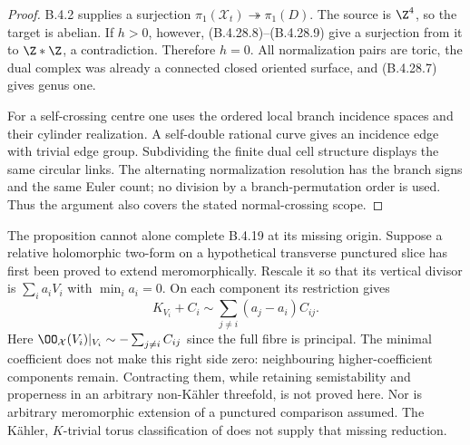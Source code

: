 \begin{proof}
B.4.2 supplies a surjection
$\pi_1(\mathcal X_t)\twoheadrightarrow\pi_1(D)$.
The source is $\Z^4$, so the target is abelian.
If $h>0$, however, (B.4.28.8)--(B.4.28.9) give a
surjection from it to $\Z*\Z$, a contradiction.
Therefore $h=0$. All normalization pairs are toric,
the dual complex was already a connected closed
oriented surface, and (B.4.28.7) gives genus one.

For a self-crossing centre one uses the ordered local
branch incidence spaces and their cylinder realization.
A self-double rational curve gives an incidence edge
with trivial edge group. Subdividing the finite dual
cell structure displays the same circular links.
The alternating normalization resolution has the
branch signs and the same Euler count; no division by
a branch-permutation order is used. Thus the argument
also covers the stated normal-crossing scope.
\end{proof}

\begin{remark}
The proposition cannot alone complete B.4.19 at its
missing origin. Suppose a relative holomorphic two-form
on a hypothetical transverse punctured slice has first
been proved to extend meromorphically. Rescale it so
that its vertical divisor is $\sum_i a_iV_i$ with
$\min_i a_i=0$. On each component its restriction gives
\[
 K_{V_i}+C_i\sim\sum_{j\ne i}(a_j-a_i)C_{ij}.          \tag{B.4.28.10}
\]
Here $\OO_{\mathcal X}(V_i)|_{V_i}\sim
-\sum_{j\ne i}C_{ij}$ since the full fibre is principal.
The minimal coefficient does not make this right side
zero: neighbouring higher-coefficient components remain.
Contracting them, while retaining semistability and
properness in an arbitrary non-K\"ahler threefold, is
not proved here. Nor is arbitrary meromorphic extension
of a punctured comparison assumed. The K\"ahler,
$K$-trivial torus classification of
\citet[Theorem 3.1]{KamenovaToriRoot} does not supply
that missing reduction.
\end{remark}

